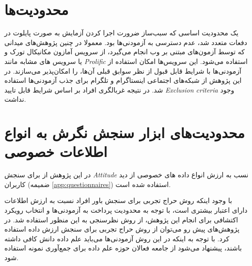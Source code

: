 \section{محدودیت‌ها}
یک محدودیت اساسی  که سبب‌ساز ضرورت اجرا کردن آزمایش به صورت
 پایلوت در دفعات متعدد شد، عدم دسترسی به آزمودنی‌ها بود. معمولا
  در چنین پژوهش‌های میدانی که توسط آزمون‌های مبتنی بر وب
   انجام می‌گیرد، از سرویس آمازون مکانیکال تورک و یا سرویس های مشابه مانند 
\textit{
    \gls{Prolific}
}
استفاده می‌شود. این سرویس‌ها امکان استفاده از آزمودنی‌ها با شرایط قابل قبول
 از نظر سوابق قبلی آن‌ها، را امکان‌پذیر می‌سازند. در این پژوهش از
  شبکه‌های اجتماعی  اینستاگرام و تلگرام برای جذب آزمودنی‌ها استفاده شد. در
   نتیجه غربالگری افراد بر اساس شرایط قابل تایید 
\textit{
    \gls{Exclusion criteria}
}
وجود نداشت.
\section*{محدودیت‌های ابزار سنجش نگرش به انواع اطلاعات خصوصی}
در این پژوهش از برای سنجش 
{\textit{\gls{Attitude}}}
نسب به ارزش انواع داده های خصوصی از دید کاربران 
(ضمیمه \ref{app:questionnaires})
استفاده شده است.

با وجود اینکه روش حراج تجربی برای سنجش باور افراد نسبت به ارزش اطلاعات دارای اعتبار بیشتری است، با توجه به محدودیت پرداخت 
به آزمودنی‌ها و انتخاب رویکرد اکتشافی برای انجام این پژوهش، از روش نظرسنجی به این منظور استفاده شد. در پژوهش‌های پیش رو می‌توان از روش حراج تجربی برای سنجش ارزش داده
استفاده کرد. با توجه به اینکه در این روش آزمودنی‌ها می‌باید علم داده دانش کافی داشته باشند، پیشنهاد می‌شود از جامعه فعالان حوزه علم داده برای جمع‌آوری نمونه استفاده
شود.
